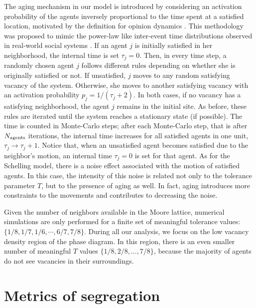 The aging mechanism in our model is introduced by considering an activation probability of the agents inversely proportional to the time spent at a satisfied location, motivated by the definition for opinion dynamics \cite{artime-2018}. This methodology was proposed to mimic the power-law like inter-event time distributions observed in real-world social systems \cite{barabasi-2005,fernandez-gracia-2011}. If an agent $j$ is initially satisfied in her neighborhood, the internal time is set $\tau_j = 0$. Then, in every time step, a randomly chosen agent $j$ follows different rules depending on whether she is originally satisfied or not. If unsatisfied, $j$ moves to any random satisfying vacancy of the system. Otherwise, she moves to another satisfying vacancy with an activation probability $p_j = 1 / (\tau_j + 2)$. In both cases, if no vacancy has a satisfying neighborhood, the agent $j$ remains in the initial site. As before, these rules are iterated until the system reaches a stationary state (if possible). The time is counted in Monte-Carlo steps; after each Monte-Carlo step, that is after $N_{\rm agents}$ iterations, the internal time increases for all satisfied agents in one unit, $\tau_j \to \tau_j + 1$. Notice that, when an unsatisfied agent becomes satisfied due to the neighbor's motion, an internal time $\tau_j = 0$ is set for that agent. As for the Schelling model, there is a noise effect associated with the motion of satisfied agents. In this case, the intensity of this noise is related not only to the tolerance parameter $T$, but to the presence of aging as well. In fact, aging introduces more constraints to the movements and contributes to decreasing the noise.  

Given the number of neighbors available in the Moore lattice, numerical simulations are only performed for a finite set of meaningful tolerance values: $\{1/8,1/7,1/6, \cdots ,6/7,7/8 \}$. During all our analysis, we focus on the low vacancy density region of the phase diagram. In this region, there is an even smaller number of meaningful $T$ values $\{1/8,2/8,...,7/8\}$, because the majority of agents do not see vacancies in their surroundings.

\section{Metrics of segregation}

